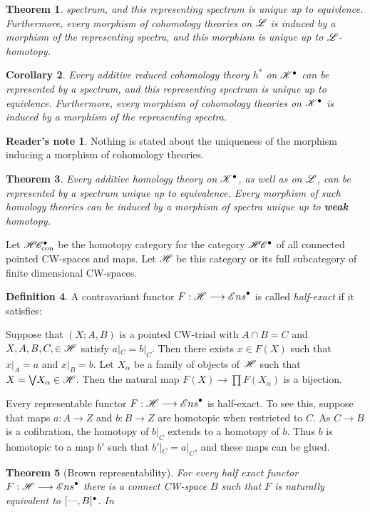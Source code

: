 \documentclass[11pt]{article}
\theoremstyle{plain}
\newtheorem{thm}{Theorem}[subsection]
\newtheorem{cor}[thm]{Corollary}
\theoremstyle{definition}
\newtheorem{defn}[thm]{Definition}
\newtheorem*{ReadersNote}{Reader's note}
\newcommand{\HC}{\scrH\!\scrC}
\newcommand{\HCWcon}{\HC_\textup{con}}
\begin{document}
{\begin{thm}
spectrum, and this representing spectrum is unique up to equivlence.
Furthermore, every morphism of cohomology theories on $\mathscr{L}$ is induced by a
morphism of the representing spectra, and this morphism is unique up to
$\mathscr{L}$-homotopy.
\end{thm}
\begin{cor}
Every additive reduced cohomology theory $h^*$ on $\mathscr{K}^\bullet$ can be
represented by a spectrum, and this representing spectrum is unique up to
equivlence. Furthermore, every morphism of cohomology theories on
$\mathscr{K}^\bullet$ is induced by a morphism of the representing spectra.
\end{cor}
\begin{ReadersNote} Nothing is stated about the uniqueness of the morphism
inducing a morphism of cohomology theories.
\end{ReadersNote}
\begin{thm}
Every additive homology theory on $\mathscr{K}^\bullet$, as well as on $\mathscr{L}$, can be
represented by a spectrum unique up to equivalence. Every morphism of such
homology theories can be induced by a morphism of spectra unique up to
\textbf{weak} homotopy.
\end{thm}
Let $\HCWcon^\bullet$ be the homotopy category for the category
$\HC^\bullet$ of all connected pointed CW-spaces and maps. Let $\mathscr{H}$ be this
category or its full subcategory of finite dimensional CW-spaces.
\begin{defn}
A contravariant functor $F:\mathscr{H}\longrightarrow{\mathscr{E}ns}^\bullet$ is called \emph{half-exact} if
it satisfies:
\begin{itemise}
\itm[(i)]Suppose that $(X;A,B)$ is a pointed CW-triad with $A\cap B=C$ and
$X,A,B,C,\in\mathscr{H}$ satisfy $a|_C=b|_C$. Then there exists $x\in F(X)$ such that
$x|_A=a$ and $x|_B=b$.
\itm[(ii)]Let $X_\alpha$ be a family of objects of $\mathscr{H}$ such that
$X=\bigvee\! X_\alpha\in\mathscr{H}$. Then the natural map $F(X)\to\prod F(X_\alpha)$
is a bijection.
\end{itemise}
\end{defn}
Every representable functor $F:\mathscr{H}\longrightarrow{\mathscr{E}ns}^\bullet$ is half-exact. To see this,
suppose that maps $a:A\to Z$ and $b:B\to Z$ are homotopic when restricted to
$C$. As $C\to B$ is a cofibration, the homotopy of $b|_C$ extends to a homotopy
of $b$. Thus $b$ is homotopic to a map $b'$ such that $b'|_C=a|_C$, and these
maps can be glued.
\begin{thm}[Brown representability]
For every half exact functor $F:\mathscr{H}\longrightarrow{\mathscr{E}ns}^\bullet$ there is a connect
CW-space $B$ such that $F$ is naturally equivalent to $[\textup{---},B]^\bullet$. In

\end{thm}}
\end{document}
